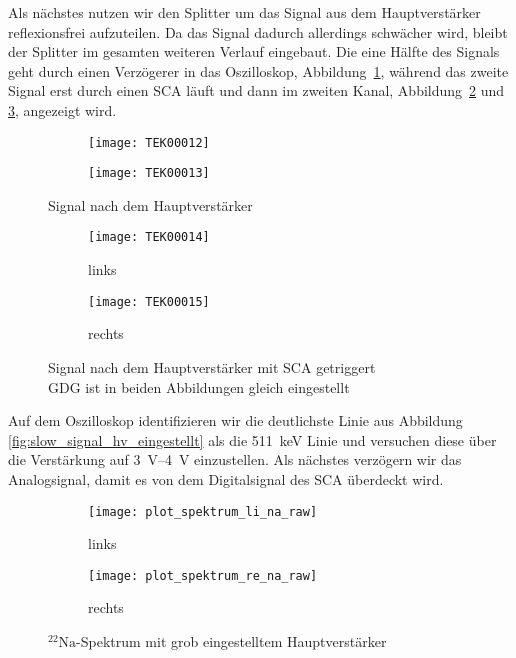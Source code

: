 \documentclass[11pt, ngerman, fleqn, DIV=15, headinclude, BCOR=2cm]{scrreprt}
\begin{document}
Als nächstes nutzen wir den Splitter um das Signal aus dem Hauptverstärker
reflexionsfrei aufzuteilen. Da das Signal dadurch allerdings schwächer wird,
bleibt der Splitter im gesamten weiteren Verlauf eingebaut. Die eine Hälfte des
Signals geht durch einen Verzögerer in das Oszilloskop, Abbildung~\ref{fig:slow_signal_hv}, während das zweite Signal erst
durch einen SCA läuft und dann im zweiten Kanal,
Abbildung~\ref{fig:slow_signal_sca_trig-li} und
\ref{fig:slow_signal_sca_trig-re}, angezeigt wird.

\begin{figure}[htbp]
	\centering
	\begin{subfigure}{0.49 \textwidth}
		\texttt{[image: TEK00012]}
	\end{subfigure}
	\begin{subfigure}{0.49 \textwidth}
		\texttt{[image: TEK00013]}
	\end{subfigure}
	\caption{%
		Signal nach dem Hauptverstärker
	}
	\label{fig:slow_signal_hv}
\end{figure}

\begin{figure}[htbp]
	\centering
	\begin{subfigure}{0.49 \textwidth}
		\texttt{[image: TEK00014]}
		\caption{%
			links
		}
		\label{fig:slow_signal_sca_trig-li}
	\end{subfigure}
	\begin{subfigure}{0.49 \textwidth}
		\texttt{[image: TEK00015]}
		\caption{%
			rechts
		}
		\label{fig:slow_signal_sca_trig-re}
	\end{subfigure}
	\caption{%
		Signal nach dem Hauptverstärker mit SCA getriggert\\
		GDG ist in beiden Abbildungen gleich eingestellt
	}
	\label{fig:slow_signal_sca_trig}
\end{figure}

Auf dem Oszilloskop identifizieren wir die deutlichste Linie aus Abbildung
\ref{fig:slow_signal_hv_eingestellt} als die \SI{511}{\kilo\electronvolt}
Linie und versuchen diese über die Verstärkung auf \SIrange{3}{4}{\volt}
einzustellen. Als nächstes verzögern wir das Analogsignal, damit es von dem
Digitalsignal des SCA überdeckt wird.

\begin{figure}[htbp]
	\centering
	\begin{subfigure}{0.49 \textwidth}
		\texttt{[image: plot\_spektrum\_li\_na\_raw]}
		\caption{%
			links
		}
		\label{fig:slow_signal_sca_trig-li_plot}
	\end{subfigure}
	\begin{subfigure}{0.49 \textwidth}
		\texttt{[image: plot\_spektrum\_re\_na\_raw]}
		\caption{%
			rechts
		}
		\label{fig:slow_signal_sca_trig-re_plot}
	\end{subfigure}
	\caption{%
		$^{22}\text{Na}$-Spektrum mit grob eingestelltem
		Hauptverstärker
	}
	\label{fig:slow_signal_sca_trig_plot}
\end{figure}
\end{document}
